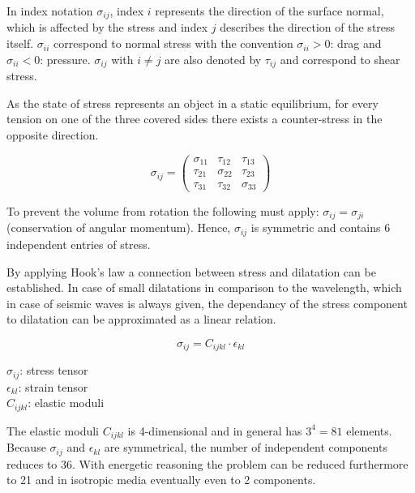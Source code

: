 \documentclass[pdftex,a4paper,parskip,listof=totoc,bibliography=totoc,onehalfspacing,12pt]{scrreprt}
\begin{document}
In index notation $\sigma_{ij}$, index $i$ represents the direction of the surface normal, which is affected by the stress and index $j$ describes the direction of the stress itself. 
$\sigma_{ii}$ correspond to normal stress with the convention $\sigma_{ii} > 0$: drag and $\sigma_{ii} < 0$: pressure. $\sigma_{ij}$ with  $i \neq j$ are also denoted by $\tau_{ij}$ and correspond to shear stress. 

As the state of stress represents an object in a static equilibrium, for every tension on one of the three covered sides there exists a counter-stress in the opposite direction. 

\begin{minipage}[t]{0.4\textwidth}
\begin{equation}
	\sigma_{ij}=\left(
\begin{array}{ccc}
\sigma_{11} & \tau_{12} & \tau_{13}\\
\tau_{21} & \sigma_{22} & \tau_{23}\\
\tau_{31} & \tau_{32} & \sigma_{33}
\end{array}
\right)
\end{equation}
\end{minipage}
\hfill
\begin{minipage}[t]{0.45\textwidth}
To prevent the volume from rotation the following must apply: $\sigma_{ij} = \sigma_{ji}$ (conservation of angular momentum). Hence, $\sigma_{ij}$ is symmetric and contains \num{6} independent entries of stress.
\end{minipage}

By applying Hook's law a connection between stress and dilatation  can be established. In case of small dilatations in comparison to the wavelength, which in case of seismic waves is always given, the dependancy of the stress component to dilatation can be approximated as a linear relation.

\begin{minipage}[t]{0.4\textwidth}
\begin{equation}
	\sigma_{ij} = C_{ijkl} \cdot\epsilon_{kl}
\end{equation}
\end{minipage}
\hfill
\begin{minipage}[t]{0.45\textwidth}
$\sigma_{ij}$: stress tensor\\
$\epsilon_{kl}$: strain tensor\\
$C_{ijkl}$: elastic moduli
\end{minipage}

The elastic moduli $C_{ijkl}$ is \num{4}-dimensional and  in general has $3^4 = 81$ elements. Because $\sigma_{ij}$ and $\epsilon_{kl}$ are symmetrical, the number of independent components reduces to \num{36}. With energetic reasoning the problem can be reduced furthermore to \num{21} and in isotropic media eventually even to \num{2} components. 
\end{document}
